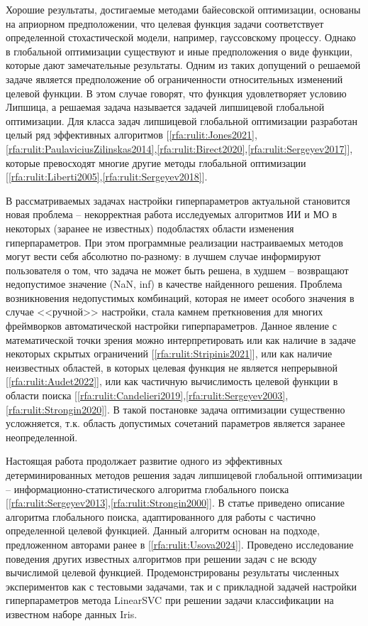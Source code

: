 \documentclass[a4paper,12pt,russian]{article}
\begin{document}
Хорошие результаты, достигаемые методами байесовской оптимизации, основаны на априорном предположении, что целевая функция задачи соответствует определенной стохастической модели, например, гауссовскому процессу. Однако в глобальной оптимизации существуют и иные предположения о виде функции, которые дают замечательные результаты.
Одним  из таких  допущений о решаемой  задаче является предположение об ограниченности относительных изменений целевой функции. В этом случае говорят, что функция удовлетворяет условию Липшица, а решаемая задача называется задачей липшицевой глобальной оптимизации. Для класса задач липшицевой глобальной оптимизации разработан целый ряд эффективных алгоритмов [\ref{rfa:rulit:Jones2021},\ref{rfa:rulit:PaulaviciusZilinskas2014},\ref{rfa:rulit:Birect2020},\ref{rfa:rulit:Sergeyev2017}], которые превосходят многие другие методы глобальной оптимизации [\ref{rfa:rulit:Liberti2005},\ref{rfa:rulit:Sergeyev2018}].

В рассматриваемых задачах настройки гиперпараметров актуальной становится новая проблема -- некорректная работа исследуемых алгоритмов ИИ и МО в некоторых (заранее не известных) подобластях области изменения гиперпараметров. 
При этом программные реализации настраиваемых методов могут вести себя абсолютно по-разному: в лучшем случае информируют пользователя о том, что задача не может быть решена, в худшем -- возвращают недопустимое значение (NaN, inf) в качестве найденного решения. Проблема возникновения недопустимых комбинаций, которая не имеет особого значения в случае <<ручной>> настройки, стала камнем преткновения для многих фреймворков автоматической настройки гиперпараметров.
Данное явление с математической точки зрения можно интерпретировать или как наличие в задаче некоторых скрытых ограничений [\ref{rfa:rulit:Stripinis2021}], или как наличие неизвестных областей, в которых целевая функция не является непрерывной [\ref{rfa:rulit:Audet2022}], или как частичную вычислимость целевой функции в области поиска [\ref{rfa:rulit:Candelieri2019},\ref{rfa:rulit:Sergeyev2003},\ref{rfa:rulit:Strongin2020}]. В такой постановке задача оптимизации существенно усложняется, т.к. область допустимых сочетаний параметров является заранее неопределенной.


Настоящая работа продолжает развитие одного из эффективных детерминированных методов решения задач липшицевой глобальной оптимизации -- ин\-фор\-ма\-ци\-он\-но-ста\-тис\-ти\-чес\-ко\-го алгоритма глобального поиска [\ref{rfa:rulit:Sergeyev2013},\ref{rfa:rulit:Strongin2000}]. В статье приведено описание алгоритма глобального поиска, адаптированного для работы с частично определенной целевой функцией. Данный алгоритм основан на подходе, предложенном авторами ранее в [\ref{rfa:rulit:Usova2024}]. Проведено исследование поведения других известных алгоритмов при решении задач с не всюду вычислимой целевой функцией. Продемонстрированы результаты численных экспериментов как с тестовыми задачами, так и с прикладной задачей настройки гиперпараметров метода LinearSVC при решении задачи классификации на известном наборе данных Iris.
\end{document}
